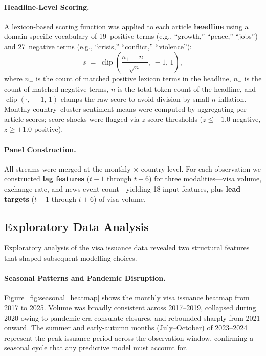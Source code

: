 \documentclass[11pt, a4paper]{article}
\begin{document}
\paragraph{Headline-Level Scoring.}
A lexicon-based scoring function was applied to each article \textbf{headline} using
a domain-specific vocabulary of 19~positive terms (e.g., ``growth,'' ``peace,'' ``jobs'')
and 27~negative terms (e.g., ``crisis,'' ``conflict,'' ``violence''):
\begin{equation}
  s \;=\; \operatorname{clip}\!\left(\frac{n_{+} - n_{-}}{\sqrt{n}},\;-1,\,1\right),
  \label{eq:sentiment}
\end{equation}
where $n_{+}$ is the count of matched positive lexicon terms in the headline,
$n_{-}$ is the count of matched negative terms, $n$ is the total token count of the
headline, and $\operatorname{clip}(\cdot,\,-1,\,1)$ clamps the raw score to avoid
division-by-small-$n$ inflation.  Monthly country--cluster sentiment means were
computed by aggregating per-article scores; score shocks were flagged via $z$-score
thresholds ($z \leq -1.0$ negative, $z \geq +1.0$ positive).

\paragraph{Panel Construction.}
All streams were merged at the monthly $\times$ country level.  For each observation we
constructed \textbf{lag features} ($t{-}1$ through $t{-}6$) for three modalities---visa
volume, exchange rate, and news event count---yielding 18 input features, plus
\textbf{lead targets} ($t{+}1$ through $t{+}6$) of visa volume.


\subsection{Exploratory Data Analysis}

Exploratory analysis of the visa issuance data revealed two structural features
that shaped subsequent modelling choices.

\paragraph{Seasonal Patterns and Pandemic Disruption.}
Figure~\ref{fig:seasonal_heatmap} shows the monthly visa issuance heatmap from
2017 to 2025.  Volume was broadly consistent across 2017--2019, collapsed during
2020 owing to pandemic-era consulate closures, and rebounded sharply from 2021
onward.  The summer and early-autumn months (July--October) of 2023--2024 represent
the peak issuance period across the observation window, confirming a seasonal
cycle that any predictive model must account for.
\end{document}

